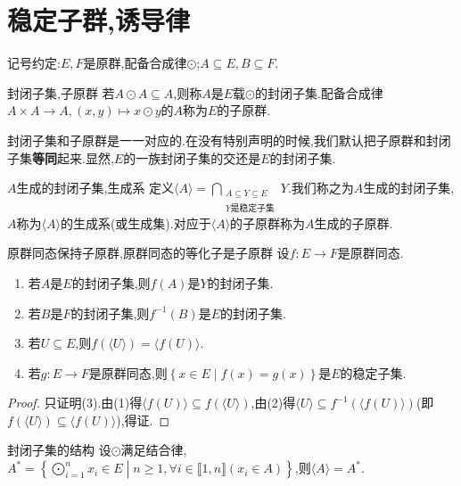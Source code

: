 \section{稳定子群,诱导律}

记号约定:$E,F$是原群,配备合成律$\odot$;$A\subseteq E,B\subseteq F$.

\begin{definition}{封闭子集,子原群}{}
	若$A\odot A\subseteq A$,则称$A$是$E$载$\odot$的封闭子集.配备合成律$A\times A\to A,\left(x,y\right)\mapsto x\odot y$的$A$称为$E$的子原群.
\end{definition}{}{}

封闭子集和子原群是一一对应的.在没有特别声明的时候,我们默认把子原群和封闭子集\textbf{等同}起来.显然,$E$的一族封闭子集的交还是$E$的封闭子集.

\begin{definition}{$A$生成的封闭子集,生成系}{}
	定义$\langle A\rangle=\bigcap\limits_{\substack{A\subseteq Y\subseteq E\\Y\text{是稳定子集}}}Y$.我们称之为$A$生成的封闭子集,$A$称为$\langle A\rangle$的生成系(或生成集).对应于$\langle A\rangle$的子原群称为$A$生成的子原群.
\end{definition}

\begin{proposition}{原群同态保持子原群,原群同态的等化子是子原群}{}
	设$f:E\to F$是原群同态.
	\begin{enumerate}
		\item 若$A$是$E$的封闭子集,则$f\left(A\right)$是$Y$的封闭子集.
		\item 若$B$是$F$的封闭子集,则$f^{-1}\left(B\right)$是$E$的封闭子集.
		\item 若$U\subseteq E$,则$f\left(\langle U\rangle\right)=\langle f\left(U\right)\rangle$.
		\item 若$g:E\to F$是原群同态,则$\left\{x\in E\middle|f\left(x\right)=g\left(x\right)\right\}$是$E$的稳定子集.
	\end{enumerate}
\end{proposition}

\begin{proof}
	只证明(3).由(1)得$\langle f\left(U\right)\rangle\subseteq f\left(\langle U\rangle\right)$,由(2)得$\langle U\rangle\subseteq f^{-1}\left(\langle f\left(U\right)\rangle\right)$(即$f\left(\langle U\rangle\right)\subseteq\langle f\left(U\right)\rangle$),得证.
\end{proof}

\begin{proposition}{封闭子集的结构}{}
	设$\odot$满足结合律,$A^{\ast}=\left\{\bigodot\limits_{i=1}^{n}x_{i}\in E\middle|n\geq 1,\forall i\in\llbracket 1,n\rrbracket\left(x_{i}\in A\right)\right\}$,则$\langle A\rangle=A^{\ast}$.
\end{proposition}

